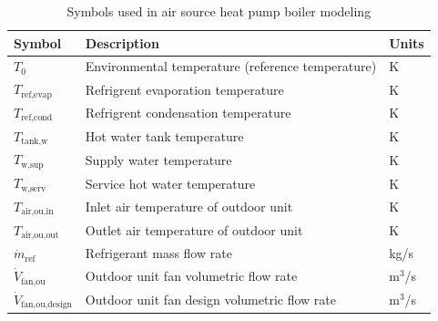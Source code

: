 \documentclass[final,5p,times,twocolumn,authoryear]{elsarticle}
\begin{document}
\begin{table}[t]
\centering
\caption{Symbols used in air source heat pump boiler modeling}
\label{tab:hpb_symbols}
\renewcommand{\arraystretch}{1.2}
\small
\begin{tabularx}{\columnwidth}{l X l}
\toprule
\textbf{Symbol} & \textbf{Description} & \textbf{Units} \\
\midrule
$T_0$ & Environmental temperature (reference temperature) & K \\
$T_{\text{ref,evap}}$ & Refrigrent evaporation temperature & K \\
$T_{\text{ref,cond}}$ & Refrigrent condensation temperature & K \\
$T_{\text{tank,w}}$ & Hot water tank temperature & K \\
$T_{\text{w,sup}}$ & Supply water temperature & K \\
$T_{\text{w,serv}}$ & Service hot water temperature & K \\
$T_{\text{air,ou,in}}$ & Inlet air temperature of outdoor unit & K \\
$T_{\text{air,ou,out}}$ & Outlet air temperature of outdoor unit & K \\
$\dot{m}_{\text{ref}}$ & Refrigerant mass flow rate & kg/s \\
$\dot{V}_{\text{fan,ou}}$ & Outdoor unit fan volumetric flow rate & m$^3$/s \\
$\dot{V}_{\text{fan,ou,design}}$ & Outdoor unit fan design volumetric flow rate & m$^3$/s \\

\end{tabularx}
\end{table}
\end{document}

